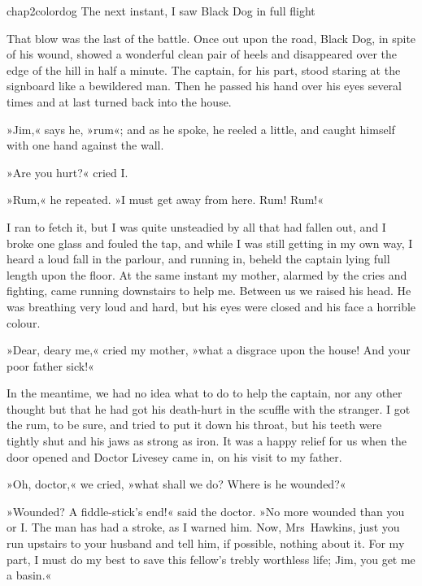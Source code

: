 \begin{colorbigpic}
	[\picsize]
	{chap2colordog}
	{The next instant, I saw Black Dog in full flight}
\end{colorbigpic}


That blow was the last of the battle. Once out upon the road, Black Dog, in spite of his wound, showed a wonderful clean pair of heels and disappeared over the edge of the hill in half a minute. The captain, for his part, stood staring at the signboard like a bewildered man. Then he passed his hand over his eyes several times and at last turned back into the house.

»Jim,« says he, »rum«; and as he spoke, he reeled a little, and caught himself with one hand against the wall.

»Are you hurt?« cried I.

»Rum,« he repeated. »I must get away from here. Rum! Rum!«

I ran to fetch it, but I was quite unsteadied by all that had fallen out, and I broke one glass and fouled the tap, and while I was still getting in my own way, I heard a loud fall in the parlour, and running in, beheld the captain lying full length upon the floor. At the same instant my mother, alarmed by the cries and fighting, came running downstairs to help me. Between us we raised his head. He was breathing very loud and hard, but his eyes were closed and his face a horrible colour.

»Dear, deary me,« cried my mother, »what a disgrace upon the house! And your poor father sick!«

In the meantime, we had no idea what to do to help the captain, nor any other thought but that he had got his death-hurt in the scuffle with the stranger. I got the rum, to be sure, and tried to put it down his throat, but his teeth were tightly shut and his jaws as strong as iron. It was a happy relief for us when the door opened and Doctor Livesey came in, on his visit to my father.

»Oh, doctor,« we cried, »what shall we do? Where is he wounded?«

»Wounded? A fiddle-stick's end!« said the doctor. »No more wounded than you or I. The man has had a stroke, as I warned him. Now, Mrs~Hawkins, just you run upstairs to your husband and tell him, if possible, nothing about it. For my part, I must do my best to save this fellow's trebly worthless life; Jim, you get me a basin.«

